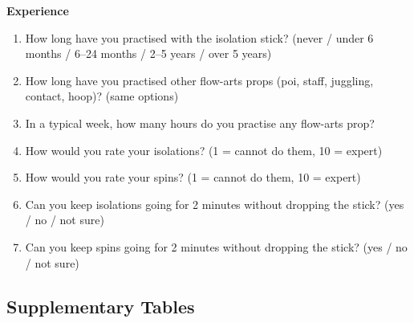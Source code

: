 \textbf{Experience}
\begin{enumerate}[leftmargin=1.5em,resume]
\item How long have you practised with the isolation stick? (never / under 6 months / 6--24 months / 2--5 years / over 5 years)
\item How long have you practised other flow-arts props (poi, staff, juggling, contact, hoop)? (same options)
\item In a typical week, how many hours do you practise any flow-arts prop?
\item How would you rate your isolations? (1 = cannot do them, 10 = expert)
\item How would you rate your spins? (1 = cannot do them, 10 = expert)
\item Can you keep isolations going for 2 minutes without dropping the stick? (yes / no / not sure)
\item Can you keep spins going for 2 minutes without dropping the stick? (yes / no / not sure)
\end{enumerate}

\subsection{Supplementary Tables}

